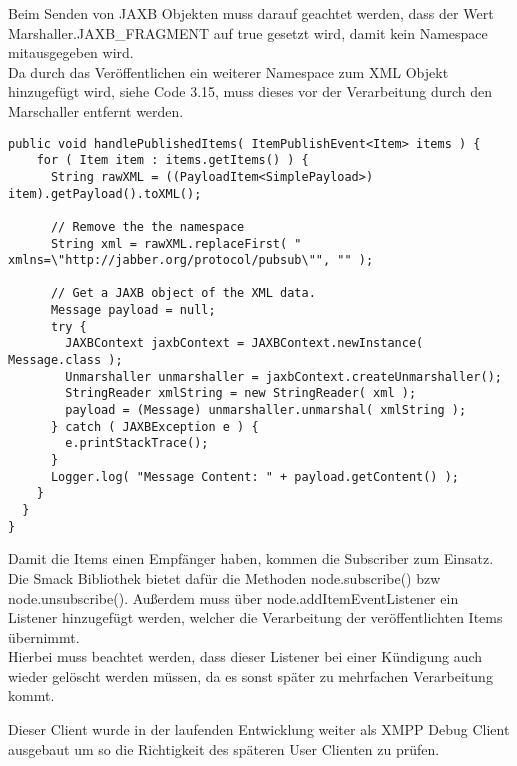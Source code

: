 Beim Senden von JAXB Objekten muss darauf geachtet werden, dass der Wert \textsf{Marshaller.JAXB\_FRAGMENT} auf \textsf{true} gesetzt wird, damit kein Namespace mitausgegeben wird.\\
Da durch das Veröffentlichen ein weiterer Namespace zum XML Objekt hinzugefügt wird, siehe Code 3.15, muss dieses vor der Verarbeitung durch den Marschaller entfernt werden.

\begin{lstlisting}[label=xmppnodegetpayload,caption=Auszug aus XMPP Client für das Verarbeiten eines veröffentlichten Items mit einem JAXB Objekt als Payload]
public void handlePublishedItems( ItemPublishEvent<Item> items ) {
    for ( Item item : items.getItems() ) {
      String rawXML = ((PayloadItem<SimplePayload>) item).getPayload().toXML();

      // Remove the the namespace
      String xml = rawXML.replaceFirst( " xmlns=\"http://jabber.org/protocol/pubsub\"", "" );

      // Get a JAXB object of the XML data.
      Message payload = null;
      try {
        JAXBContext jaxbContext = JAXBContext.newInstance( Message.class );
        Unmarshaller unmarshaller = jaxbContext.createUnmarshaller();
        StringReader xmlString = new StringReader( xml );
        payload = (Message) unmarshaller.unmarshal( xmlString );
      } catch ( JAXBException e ) {
        e.printStackTrace();
      }
      Logger.log( "Message Content: " + payload.getContent() );
    }
  }
}
\end{lstlisting}


Damit die Items einen Empfänger haben, kommen die Subscriber zum Einsatz. Die Smack Bibliothek bietet dafür die Methoden \textsf{node.subscribe()} bzw \textsf{node.unsubscribe()}. Außerdem muss über \textsf{node.addItemEventListener} ein Listener hinzugefügt werden, welcher die Verarbeitung der veröffentlichten Items übernimmt.\\
Hierbei muss beachtet werden, dass dieser Listener bei einer Kündigung auch wieder gelöscht werden müssen, da es sonst später zu mehrfachen Verarbeitung kommt.

\vspace{0.2cm}

Dieser Client wurde in der laufenden Entwicklung weiter als XMPP Debug Client ausgebaut um so die Richtigkeit des späteren User Clienten zu prüfen.
